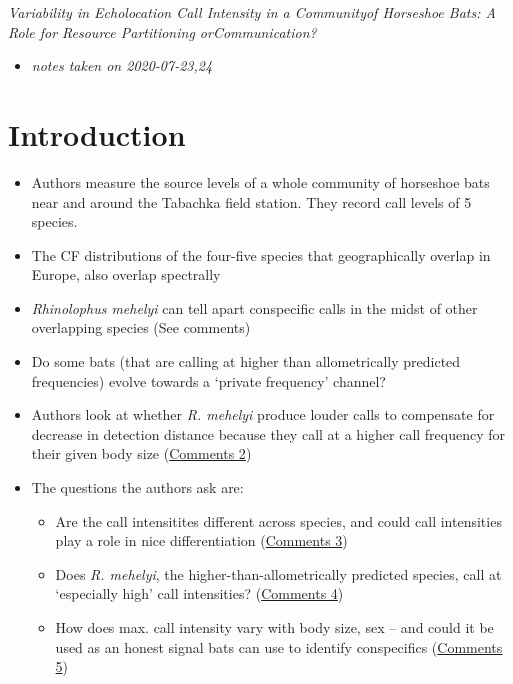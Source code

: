 \documentclass[
]{book}
\providecommand{\tightlist}{%
  \setlength{\itemsep}{0pt}\setlength{\parskip}{0pt}}
\begin{document}

\emph{Variability in Echolocation Call Intensity in a Communityof Horseshoe Bats: A Role for Resource Partitioning orCommunication?} \citep{schuchmannsiemers2010a}

\begin{itemize}
\tightlist
\item
  \emph{notes taken on 2020-07-23,24}
\end{itemize}

\hypertarget{introduction-4}{%
\section{Introduction}\label{introduction-4}}

\begin{itemize}
\item
  Authors measure the source levels of a whole community of horseshoe bats near and around the Tabachka field station. They record call levels of 5 species.
\item
  The CF distributions of the four-five species that geographically overlap in Europe, also overlap spectrally
\item
  \emph{Rhinolophus mehelyi} can tell apart conspecific calls in the midst of other overlapping species (See comments)
\item
  Do some bats (that are calling at higher than allometrically predicted frequencies) evolve towards a `private frequency' channel?
\item
  Authors look at whether \emph{R. mehelyi} produce louder calls to compensate for decrease in detection distance because they call at a higher call frequency for their given body size (\protect\hyperlink{com_shuchsiem}{Comments 2})
\item
  The questions the authors ask are:

  \begin{itemize}
  \tightlist
  \item
    Are the call intensitites different across species, and could call intensities play a role in nice differentiation (\protect\hyperlink{com_shuchsiem}{Comments 3})
  \item
    Does \emph{R. mehelyi}, the higher-than-allometrically predicted species, call at `especially high' call intensities? (\protect\hyperlink{com_shuchsiem}{Comments 4})
  \item
    How does max. call intensity vary with body size, sex -- and could it be used as an honest signal bats can use to identify conspecifics (\protect\hyperlink{com_shuchsiem}{Comments 5})
  \end{itemize}
\end{itemize}
\end{document}
